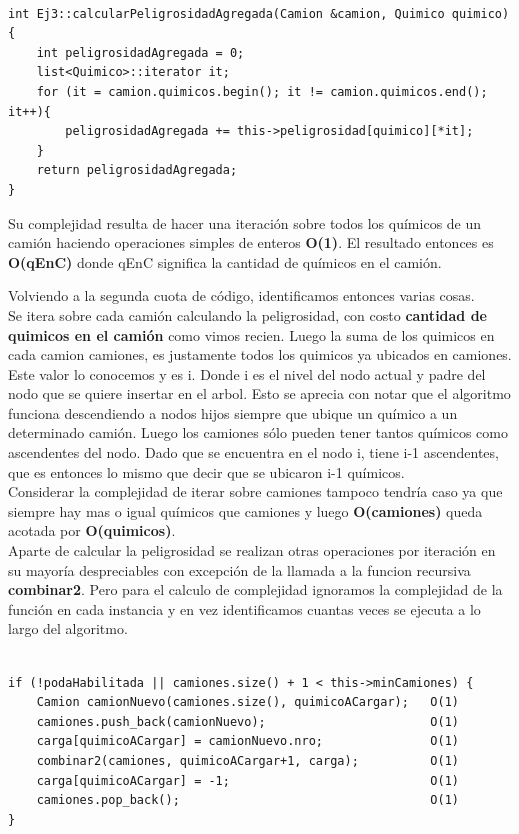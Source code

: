 \begin{lstlisting}

int Ej3::calcularPeligrosidadAgregada(Camion &camion, Quimico quimico){
	int peligrosidadAgregada = 0;
	list<Quimico>::iterator it;
	for (it = camion.quimicos.begin(); it != camion.quimicos.end(); it++){
		peligrosidadAgregada += this->peligrosidad[quimico][*it];
	}
	return peligrosidadAgregada;
}

\end{lstlisting}

\noindent 
Su complejidad resulta de hacer una iteraci\'on sobre todos los qu\'imicos de un cami\'on haciendo operaciones simples de enteros \textbf{O(1)}. El resultado entonces es \textbf{O(qEnC)} donde qEnC significa la cantidad de qu\'imicos en el cami\'on. 

\noindent 
Volviendo a la segunda cuota de c\'odigo, identificamos entonces varias cosas. \\
Se itera sobre cada cami\'on calculando la peligrosidad, con costo \textbf{cantidad de quimicos en el cami\'on} como vimos recien.
Luego la suma de los quimicos en cada camion camiones, es justamente todos los quimicos ya ubicados en camiones. Este valor lo conocemos y es i. Donde i es el nivel del nodo actual y padre del nodo que se quiere insertar en el arbol. Esto se aprecia con notar que el algoritmo funciona descendiendo a nodos hijos siempre que ubique un qu\'imico a un determinado cami\'on. Luego los camiones s\'olo pueden tener tantos qu\'imicos como ascendentes del nodo. Dado que se encuentra en el nodo i, tiene i-1 ascendentes, que es entonces lo mismo que decir que se ubicaron i-1 qu\'imicos.  \\
Considerar la complejidad de iterar sobre camiones tampoco tendr\'ia caso ya que siempre hay mas o igual qu\'imicos que camiones y luego \textbf{O(camiones)} queda acotada por \textbf{O(quimicos)}.\\
Aparte de calcular la peligrosidad se realizan otras operaciones por iteraci\'on en su mayor\'ia despreciables con excepci\'on de la llamada a la funcion recursiva \textbf{combinar2}. Pero para el calculo de complejidad ignoramos la complejidad de la funci\'on en cada instancia y en vez identificamos cuantas veces se ejecuta a lo largo del algoritmo.

\begin{lstlisting}

if (!podaHabilitada || camiones.size() + 1 < this->minCamiones) {
	Camion camionNuevo(camiones.size(), quimicoACargar);   O(1)
	camiones.push_back(camionNuevo);                       O(1)
	carga[quimicoACargar] = camionNuevo.nro;               O(1)
	combinar2(camiones, quimicoACargar+1, carga);          O(1) 
	carga[quimicoACargar] = -1;                            O(1)
	camiones.pop_back();                                   O(1)
}
\end{lstlisting}

